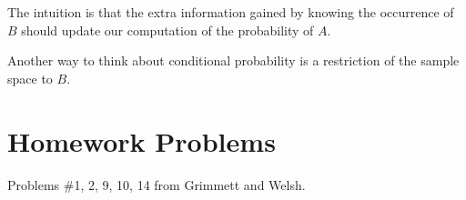 \begin{remark}
  The intuition is that the extra information gained by
  knowing the occurrence of $B$ should update our
  computation of the probability of $A$.
\end{remark}

\begin{remark}
  Another way to think about conditional probability
  is a restriction of the sample space to $B$.
\end{remark}

\section{Homework Problems}

Problems \#1, 2, 9, 10, 14 from Grimmett and Welsh.
